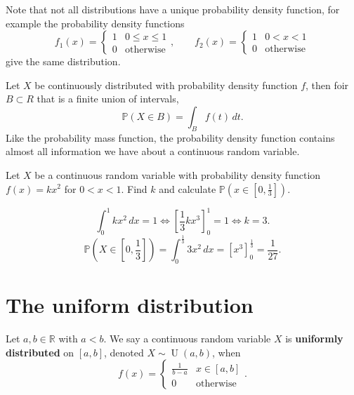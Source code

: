 \begin{remark}
    Note that not all distributions have a unique probability density function, for example the probability density functions \[ f_1(x) = \begin{cases} 1 & 0 \leq x \leq 1 \\ 0 & \text{otherwise} \end{cases}, \qquad f_2(x) = \begin{cases} 1 & 0 < x < 1 \\ 0 & \text{otherwise} \end{cases} \] give the same distribution.
\end{remark}

\begin{theorem}
    Let $X$ be continuously distributed with probability density function $f$, then foir $B \subset R$ that is a finite union of intervals, \[ \mathbb P(X \in B) = \int_B f(t) \, dt. \] Like the probability mass function, the probability density function contains almost all information we have about a continuous random variable.
\end{theorem}

\begin{example}
    Let $X$ be a continuous random variable with probability density function $f(x) = kx^2$ for $0 < x < 1$. Find $k$ and calculate $\mathbb P(x \in \left[0, \frac13\right])$.
\end{example}

\begin{solution}
    \[ \int_0^1 kx^2 \, dx = 1 \iff \left[\frac13kx^3\right]^1_0 = 1 \iff k = 3. \] \[ \mathbb P\left(X \in \left[0, \frac13\right]\right) = \int_0^{\frac13} 3x^2 \, dx = \left[x^3\right]^{\frac13}_0 = \frac1{27}. \]
\end{solution}

\section{The uniform distribution}

\begin{definition}
    Let $a, b \in \mathbb R$ with $a < b$. We say a continuous random variable $X$ is \textbf{uniformly distributed} on $[a, b]$, denoted $X \sim \operatorname{U}(a, b)$, when \[ f(x) = \begin{cases} \frac1{b - a} & x \in [a, b] \\ 0 & \text{otherwise} \end{cases}. \]
\end{definition}

